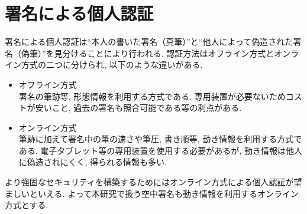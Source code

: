 \chapter{署名による個人認証}\label{pa_by_sign.tex}

署名による個人認証は“本人の書いた署名（真筆）”と“他人によって偽造された署名（偽筆）”を見分けることにより行われる.
認証方法はオフライン方式とオンライン方式の二つに分けられ, 以下のような違いがある. 
\\
\begin{itemize}
  \item{オフライン方式}\\
    署名の筆跡等, 形態情報を利用する方式である. 専用装置が必要ないためコストが安いこと, 過去の署名も照合可能である等の利点がある.
  \item{オンライン方式}\\
    筆跡に加えて署名中の筆の速さや筆圧, 書き順等, 動き情報を利用する方式である. 電子タブレット等の専用装置を使用する必要があるが, 動き情報は他人に偽造されにくく, 得られる情報も多い. \\
\end{itemize}

より強固なセキュリティを構築するためにはオンライン方式による個人認証が望ましいといえる. よって本研究で扱う空中署名も動き情報を利用するオンライン方式とする.